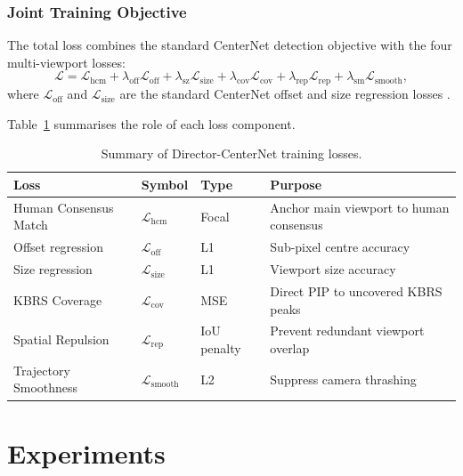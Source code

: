 \documentclass[preprint,12pt]{elsarticle}
\begin{document}
\subsubsection{Joint Training Objective}

The total loss combines the standard CenterNet detection objective with the 
four multi-viewport losses:
\begin{equation}
  \mathcal{L} = \mathcal{L}_{\text{hcm}} 
              + \lambda_{\text{off}}\mathcal{L}_{\text{off}} 
              + \lambda_{\text{sz}}\mathcal{L}_{\text{size}} 
              + \lambda_{\text{cov}}\mathcal{L}_{\text{cov}} 
              + \lambda_{\text{rep}}\mathcal{L}_{\text{rep}} 
              + \lambda_{\text{sm}}\mathcal{L}_{\text{smooth}},
  \label{eq:total_loss}
\end{equation}
where $\mathcal{L}_{\text{off}}$ and $\mathcal{L}_{\text{size}}$ are the 
standard CenterNet offset and size regression losses \cite{zhou2019objects}.

Table~\ref{tab:loss_summary} summarises the role of each loss component.

\begin{table}[t]
  \centering
  \caption{Summary of Director-CenterNet training losses.}
  \label{tab:loss_summary}
  \begin{tabular}{llll}
    \toprule
    Loss & Symbol & Type & Purpose \\
    \midrule
    Human Consensus Match & $\mathcal{L}_{\text{hcm}}$ & Focal & 
      Anchor main viewport to human consensus \\
    Offset regression & $\mathcal{L}_{\text{off}}$ & L1 & 
      Sub-pixel centre accuracy \\
    Size regression & $\mathcal{L}_{\text{size}}$ & L1 & 
      Viewport size accuracy \\
    KBRS Coverage & $\mathcal{L}_{\text{cov}}$ & MSE & 
      Direct PIP to uncovered KBRS peaks \\
    Spatial Repulsion & $\mathcal{L}_{\text{rep}}$ & IoU penalty & 
      Prevent redundant viewport overlap \\
    Trajectory Smoothness & $\mathcal{L}_{\text{smooth}}$ & L2 & 
      Suppress camera thrashing \\
    \bottomrule
  \end{tabular}
\end{table}

\section{Experiments}
\label{sec:experiments}
\end{document}

